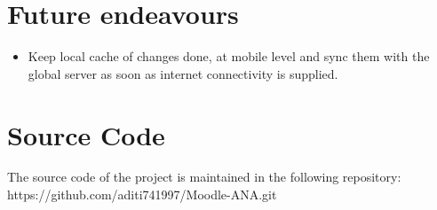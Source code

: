 \documentclass{article}
\begin{document}


\section{Future endeavours}
\begin{itemize}
\item Keep local cache of changes done, at mobile level and sync them with the global server as soon as internet connectivity is supplied.
\end{itemize}


\section{Source Code}
\par\noindent The source code of the project is maintained in the following repository:\\
https://github.com/aditi741997/Moodle-ANA.git


\medskip

\end{document}
